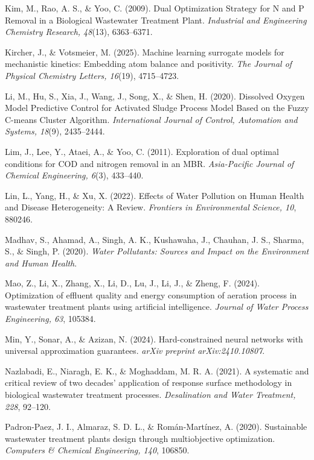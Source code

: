\documentclass[11pt]{article}
\begin{document}
\noindent Kim, M., Rao, A. S., \& Yoo, C. (2009). Dual Optimization Strategy for N and P Removal in a Biological Wastewater Treatment Plant. \textit{Industrial and Engineering Chemistry Research, 48}(13), 6363--6371.

\noindent Kircher, J., \& Votsmeier, M. (2025). Machine learning surrogate models for mechanistic kinetics: Embedding atom balance and positivity. \textit{The Journal of Physical Chemistry Letters, 16}(19), 4715--4723.

\noindent Li, M., Hu, S., Xia, J., Wang, J., Song, X., \& Shen, H. (2020). Dissolved Oxygen Model Predictive Control for Activated Sludge Process Model Based on the Fuzzy C-means Cluster Algorithm. \textit{International Journal of Control, Automation and Systems, 18}(9), 2435--2444.

\noindent Lim, J., Lee, Y., Ataei, A., \& Yoo, C. (2011). Exploration of dual optimal conditions for COD and nitrogen removal in an MBR. \textit{Asia-Pacific Journal of Chemical Engineering, 6}(3), 433--440.

\noindent Lin, L., Yang, H., \& Xu, X. (2022). Effects of Water Pollution on Human Health and Disease Heterogeneity: A Review. \textit{Frontiers in Environmental Science, 10}, 880246.

\noindent Madhav, S., Ahamad, A., Singh, A. K., Kushawaha, J., Chauhan, J. S., Sharma, S., \& Singh, P. (2020). \textit{Water Pollutants: Sources and Impact on the Environment and Human Health}.

\noindent Mao, Z., Li, X., Zhang, X., Li, D., Lu, J., Li, J., \& Zheng, F. (2024). Optimization of effluent quality and energy consumption of aeration process in wastewater treatment plants using artificial intelligence. \textit{Journal of Water Process Engineering, 63}, 105384.

\noindent Min, Y., Sonar, A., \& Azizan, N. (2024). Hard-constrained neural networks with universal approximation guarantees. \textit{arXiv preprint arXiv:2410.10807}.

\noindent Nazlabadi, E., Niaragh, E. K., \& Moghaddam, M. R. A. (2021). A systematic and critical review of two decades' application of response surface methodology in biological wastewater treatment processes. \textit{Desalination and Water Treatment, 228}, 92--120.

\noindent Padron-Paez, J. I., Almaraz, S. D. L., \& Rom\'an-Mart\'inez, A. (2020). Sustainable wastewater treatment plants design through multiobjective optimization. \textit{Computers \& Chemical Engineering, 140}, 106850.
\end{document}
